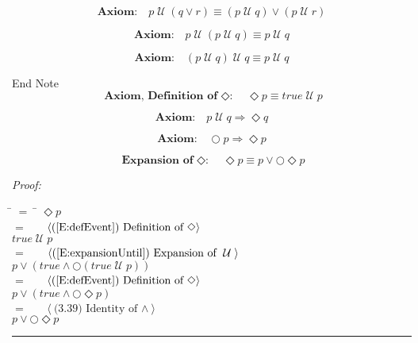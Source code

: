 \documentclass[fleqn, leqno]{article}
\newcommand{\lgap}{2pt}                             %
\newcommand{\mymathindent}{24pt}                      %
\newcommand{\until}{\;\mathcal{U}\;}
\newcommand{\next}{\bigcirc}
\newcommand{\event}{\Diamond}
\newcommand{\myqed}{\hfill\rule[-.23ex]{1.2ex}{2.0ex}}
\newcommand{\Gll} {\langle}                         %
\newcommand{\Ggg} {\rangle}                         %
\newcommand{\Hint}[1]     {\ \ \ $\Gll              \mbox{#1} \Ggg$ }   %
\begin{document}
\begin{equation}\label{E:untilOrEquiv}
\textbf{Axiom:}\quad p \until (q \lor r) \equiv (p \until q) \lor (p \until r)
\end{equation}

\begin{equation}\label{E:untilIdem}
\textbf{Axiom:}\quad p \until (p \until q) \equiv p \until q
\end{equation}

\begin{equation}\label{E:untilIdemR}
\textbf{Axiom:}\quad (p \until q) \until q \equiv p \until q
\end{equation}

End Note\\

\begin{equation}\label{E:defEvent}
\textbf{Axiom, Definition of $\event$:}\quad \event p \equiv true \until p
\end{equation}

\begin{equation}\label{E:untilImpEvent}
\textbf{Axiom:}\quad p \until q \Rightarrow \event q
\end{equation}

\begin{equation}\label{E:nextEvent}
\textbf{Axiom:}\quad \next p \Rightarrow \event p
\end{equation}


\begin{equation}\label{E:expansionEvent}
\textbf{Expansion of $\event$:}\quad \event p \equiv p \lor \next\event p
\end{equation}

\emph{Proof:}
\begin{tabbing}
\hspace{\mymathindent} \= $= \;$ \= \kill
  \> \>   $\event p$\\[\lgap]
  \> $=$  \>  \Hint{(\ref{E:defEvent}) Definition of $\event$}\\[\lgap]
  \> \>   $true \until p$\\[\lgap]
  \> $=$  \>  \Hint{(\ref{E:expansionUntil}) Expansion of $\until$}\\[\lgap]
  \> \>   $p \lor (true \land \next(true \until p))$\\[\lgap]
  \> $=$  \>  \Hint{(\ref{E:defEvent}) Definition of $\event$}\\[\lgap]
  \> \>   $p \lor (true \land \next\event p)$\\[\lgap]
  \> $=$  \>  \Hint{(3.39) Identity of $\land$}\\[\lgap]
  \> \>   $p \lor \next\event p$\\[\lgap]
\end{tabbing}
\myqed\\[\lgap]
\end{document}
